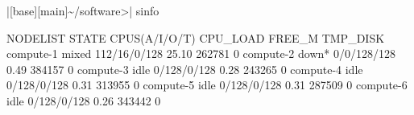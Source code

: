 \begin{cdjpasterminal}
    |[base]{\DTMcurrenttime}[main]{\textasciitilde/software}{>}| sinfo

    NODELIST   STATE  CPUS(A/I/O/T)  CPU_LOAD  FREE_M  TMP_DISK
    compute-1  mixed  112/16/0/128   25.10     262781  0
    compute-2  down*  0/0/128/128    0.49      384157  0
    compute-3  idle   0/128/0/128    0.28      243265  0
    compute-4  idle   0/128/0/128    0.31      313955  0
    compute-5  idle   0/128/0/128    0.31      287509  0
    compute-6  idle   0/128/0/128    0.26      343442  0
\end{cdjpasterminal}
